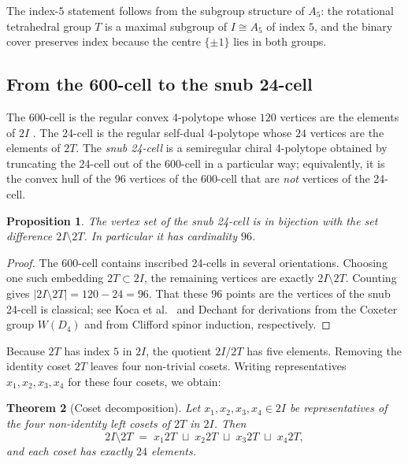 \documentclass[10pt,reqno]{amsart}
\theoremstyle{plain}
\newtheorem{theorem}{Theorem}[section]
\newtheorem{proposition}[theorem]{Proposition}
\theoremstyle{definition}
\begin{document}
The index-$5$ statement follows from the subgroup structure of $A_5$: the rotational tetrahedral group $T$ is a maximal subgroup of $I \cong A_5$ of index $5$, and the binary cover preserves index because the centre $\{\pm1\}$ lies in both groups.

\subsection{From the 600-cell to the snub 24-cell}

The 600-cell is the regular convex 4-polytope whose $120$ vertices are the elements of $2I$ \cite{Coxeter1946,CS1999}. The 24-cell is the regular self-dual 4-polytope whose $24$ vertices are the elements of $2T$. The \emph{snub 24-cell} is a semiregular chiral 4-polytope obtained by truncating the 24-cell out of the 600-cell in a particular way; equivalently, it is the convex hull of the $96$ vertices of the 600-cell that are \emph{not} vertices of the 24-cell.

\begin{proposition}\label{prop:96}
The vertex set of the snub 24-cell is in bijection with the set difference $2I \setminus 2T$. In particular it has cardinality $96$.
\end{proposition}

\begin{proof}
The 600-cell contains inscribed 24-cells in several orientations. Choosing one such embedding $2T \subset 2I$, the remaining vertices are exactly $2I \setminus 2T$. Counting gives $|2I \setminus 2T| = 120 - 24 = 96$. That these $96$ points are the vertices of the snub 24-cell is classical; see Koca et al.~\cite{Koca2011} and Dechant \cite{Dechant2021} for derivations from the Coxeter group $W(D_4)$ and from Clifford spinor induction, respectively.
\end{proof}

Because $2T$ has index $5$ in $2I$, the quotient $2I/2T$ has five elements. Removing the identity coset $2T$ leaves four non-trivial cosets. Writing representatives $x_1, x_2, x_3, x_4$ for these four cosets, we obtain:

\begin{theorem}[Coset decomposition]\label{thm:cosets}
Let $x_1, x_2, x_3, x_4 \in 2I$ be representatives of the four non-identity left cosets of $2T$ in $2I$. Then
\begin{equation}\label{eq:coset-decomp}
2I \setminus 2T \;=\; x_1 2T \;\sqcup\; x_2 2T \;\sqcup\; x_3 2T \;\sqcup\; x_4 2T,
\end{equation}
and each coset has exactly $24$ elements.
\end{theorem}
\end{document}
